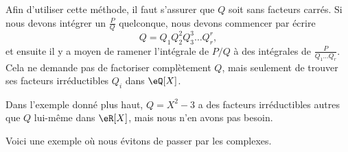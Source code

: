 \begin{remark}
    Afin d'utiliser cette méthode, il faut s'assurer que \( Q\) soit sans facteurs carrés. Si nous devons intégrer un \( \frac{ P }{ Q }\) quelconque, nous devons commencer par écrire
    \begin{equation}
        Q=Q_1Q_2^2Q_3^3\ldots Q_r^r,
    \end{equation}
    et ensuite il y a moyen de ramener l'intégrale de \( P/Q\) à des intégrales de \( \frac{ P }{ Q_1\ldots Q_r }\). Cela ne demande pas de factoriser complètement \( Q\), mais seulement de trouver ses facteurs irréductibles \( Q_i\) dans \( \eQ[X]\).

    Dans l'exemple donné plus haut, \( Q=X^2-3\) a des facteurs irréductibles autres que \( Q\) lui-même dans \( \eR[X]\), mais nous n'en avons pas besoin.
\end{remark}

Voici une exemple où nous évitons de passer par les complexes.

